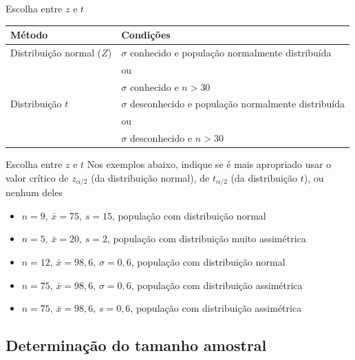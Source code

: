 \documentclass[10pt]{beamer}\usepackage[]{graphicx}\usepackage[]{color}
\theoremstyle{definition}
\begin{document}
\begin{frame}{Escolha entre $z$ e $t$}
  \begin{table}[h]
    \centering
    \begin{tabular}{lp{6cm}}
      \hline
      \textbf{Método} & \textbf{Condições} \\
      \hline
      Distribuição normal ($Z$) & $\sigma$ conhecido e população
      normalmente distribuída \\
                                & ou \\
                                & $\sigma$ conhecido e $n>30$ \\
     \hline
     Distribuição $t$ & $\sigma$ desconhecido e população normalmente
     distribuída \\
                     & ou \\
                     & $\sigma$ desconhecido e $n>30$ \\
    \hline
    \end{tabular}
  \end{table}
\end{frame}

\begin{frame}{Escolha entre $z$ e $t$}
  Nos exemplos abaixo, indique se é mais apropriado usar o valor crítico
  de $z_{\alpha/2}$ (da distribuição normal), de $t_{\alpha/2}$ (da
  distribuição $t$), ou nenhum deles
  \begin{itemize}
  \item[a)] $n=9,\, \bar{x}=75,\, s=15$, população com distribuição
    normal
  \item[b)] $n=5,\, \bar{x}=20,\, s=2$, população com distribuição
    muito assimétrica
  \item[c)] $n=12,\, \bar{x}=98,6,\, \sigma=0,6$, população com
    distribuição normal
  \item[d)] $n=75,\, \bar{x}=98,6,\, \sigma=0,6$, população com
    distribuição assimétrica
  \item[e)] $n=75,\, \bar{x}=98,6,\, s=0,6$, população com
    distribuição assimétrica
  \end{itemize}
\end{frame}

\subsection{Determinação do tamanho amostral}
\end{document}
